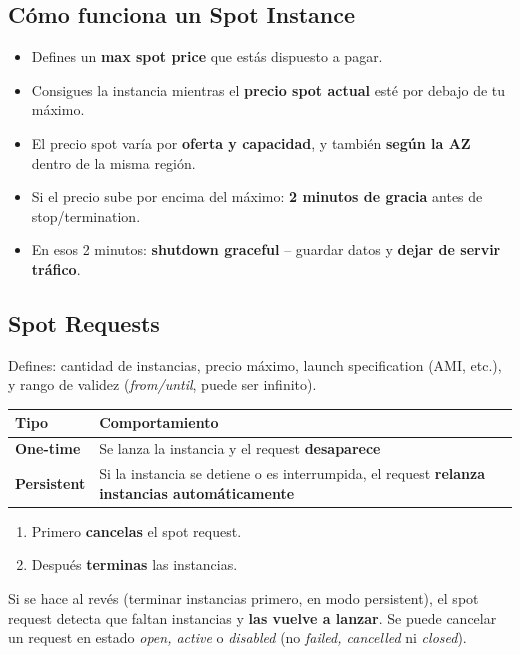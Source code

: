 \documentclass[11pt,a4paper]{article}
\let\oldsubsection\subsection
\renewcommand{\subsection}{\Needspace{6\baselineskip}\oldsubsection}
\newcommand{\en}[1]{\textit{#1}}
\begin{document}
\subsection{Cómo funciona un Spot Instance}
\begin{itemize}
  \item Defines un \textbf{max spot price} que estás dispuesto a pagar.
  \item Consigues la instancia mientras el \textbf{precio spot actual} esté por debajo de tu máximo.
  \item El precio spot varía por \textbf{oferta y capacidad}, y también \textbf{según la AZ} dentro de la misma región.
  \item Si el precio sube por encima del máximo: \textbf{2 minutos de gracia} antes de stop/termination.
  \item En esos 2 minutos: \textbf{shutdown graceful} -- guardar datos y \textbf{dejar de servir tráfico}.
\end{itemize}

\subsection{Spot Requests}
Defines: cantidad de instancias, precio máximo, launch specification (AMI, etc.), y rango de validez (\en{from/until}, puede ser infinito).

\begin{tabularx}{\linewidth}{@{}>{\bfseries}l L@{}}
\toprule
Tipo & Comportamiento \\
\midrule
One-time & Se lanza la instancia y el request \textbf{desaparece} \\
Persistent & Si la instancia se detiene o es interrumpida, el request \textbf{relanza instancias automáticamente} \\
\bottomrule
\end{tabularx}

\begin{alerta}[title=Orden correcto para terminar Spot Instances (examinable)]
\begin{enumerate}
  \item Primero \textbf{cancelas} el spot request.
  \item Después \textbf{terminas} las instancias.
\end{enumerate}
Si se hace al revés (terminar instancias primero, en modo persistent), el spot request detecta que faltan instancias y \textbf{las vuelve a lanzar}. Se puede cancelar un request en estado \textit{open, active} o \textit{disabled} (no \textit{failed, cancelled} ni \textit{closed}).
\end{alerta}
\end{document}
